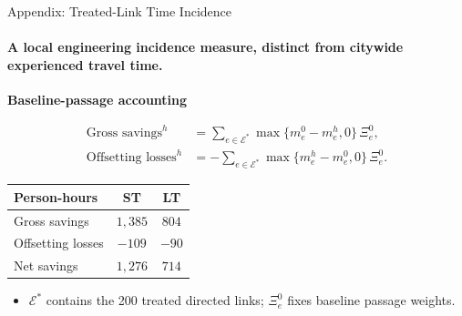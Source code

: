 \documentclass[11pt,aspectratio=169]{beamer}
\newcommand{\navback}[1]{\par\vspace{0.35em}\noindent\hfill\hyperlink{#1}{\beamerreturnbutton{back}}}
\begin{document}
\begin{frame}[label=apptreatedtime]{Appendix: Treated-Link Time Incidence}
\framesubtitle{A local engineering incidence measure, distinct from citywide experienced travel time.}
\footnotesize
\textbf{Baseline-passage accounting}\par
\vspace{0.10em}
\begin{align*}
\text{Gross savings}^{h}
  &=\sum_{e\in\mathcal E^*}\max\{m_e^0-m_e^h,0\}\,\Xi_e^0,\\
\text{Offsetting losses}^{h}
  &=-\sum_{e\in\mathcal E^*}\max\{m_e^h-m_e^0,0\}\,\Xi_e^0.
\end{align*}
\vspace{-0.45em}
\begin{center}
\renewcommand{\arraystretch}{1.18}
\begin{tabular}{lcc}
\toprule
Person-hours & ST & LT \\
\midrule
Gross savings & $1{,}385$ & $804$ \\
Offsetting losses & $-109$ & $-90$ \\
Net savings & $1{,}276$ & $714$ \\
\bottomrule
\end{tabular}
\end{center}
\vspace{0.15em}
\begin{itemize}\scriptsize\setlength\itemsep{0.25em}
  \item $\mathcal E^*$ contains the 200 treated directed links; $\Xi_e^0$ fixes baseline passage weights.
\end{itemize}
\navback{result2}
\end{frame}
\end{document}
